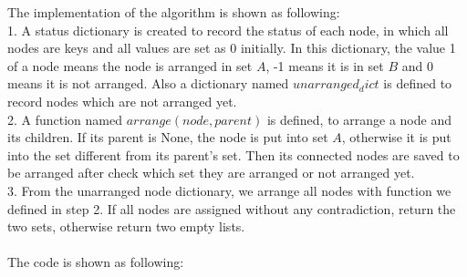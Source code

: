 \documentclass[a4paper,11pt]{article}
\begin{document}
The implementation of the algorithm is shown as following: \\
1. A status dictionary is created to record the status of each node, in which all nodes are keys and all values are set as 0 initially. In this dictionary, the value 1 of a node means the node is arranged in set $A$, -1 means it is in set $B$ and 0 means it is not arranged. Also a dictionary named $unarranged_dict$ is defined to record nodes which are not arranged yet. \\
2. A function named $arrange(node, parent)$ is defined, to arrange a node and its children. If its parent is None, the node is put into set $A$, otherwise it is put into the set different from its parent's set. Then its connected nodes are saved to be arranged after check which set they are arranged or not arranged yet. \\
3. From the unarranged node dictionary, we arrange all nodes with function we defined in step 2. If all nodes are assigned without any contradiction, return the two sets, otherwise return two empty lists. \\\\
The code is shown as following: 
\end{document}
